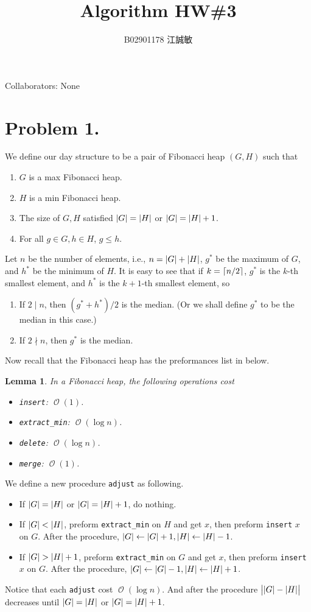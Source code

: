 \documentclass[12pt, a4paper]{article}
\title{Algorithm HW\#3}
\author{B02901178 江誠敏}
\DeclarePairedDelimiter{\abs}{\lvert}{\rvert}
\DeclarePairedDelimiter{\ceil}{\lceil}{\rceil}
\newcommand{\opord}{\operatorname{\mathcal{O}}}
\newcommand{\ord}[1]{\opord\left(#1\right)}
\newtheorem{lemma}{Lemma}
\begin{document}
\maketitle
Collaborators: None

\section{Problem 1.}
We define our day structure to be a pair of Fibonacci heap $(G, H)$ such that 
\begin{enumerate}
  \item $G$ is a max Fibonacci heap.
  \item $H$ is a min Fibonacci heap. 
  \item The size of $G, H$ satisfied $\abs{G} = \abs{H}$ or $\abs{G} = \abs{H} + 1$.
  \item For all $g \in G, h \in H$, $g \leq h$.
\end{enumerate}
Let $n$ be the number of elements, i.e., $n = \abs{G} + \abs{H}$,
$g^*$ be the maximum of $G$, and $h^*$ be the minimum of $H$. It is easy to see that
if $k = \ceil{n/2}$, $g^*$ is the $k$-th smallest element, and $h^*$ is the $k+1$-th
smallest element, so
\begin{enumerate}
  \item If $2 \mid n$, then $(g^* + h^*) / 2$ is the median. (Or we shall define $g^*$ to
    be the median in this case.)
  \item If $2 \nmid n$, then $g^*$ is the median.
\end{enumerate}
Now recall that the Fibonacci heap has the preformances list in below.
\begin{lemma}
  In a Fibonacci heap, the following operations cost
  \begin{itemize}[itemsep=-0.2cm]
    \item {\tt insert}: $\ord{1}$.
    \item {\tt extract\_min}: $\ord{\log n}$.
    \item {\tt delete}: $\ord{\log n}$.
    \item {\tt merge}: $\ord{1}$.
  \end{itemize}
\end{lemma}

We define a new procedure {\tt adjust} as following.
\begin{itemize}
  \item If $\abs{G} = \abs{H}$ or $\abs{G} = \abs{H} + 1$, do nothing.
  \item If $\abs{G} < \abs{H}$, preform {\tt extract\_min} on $H$ and get $x$,
    then preform {\tt insert} $x$ on $G$. After the procedure, $\abs{G} \gets \abs{G} + 1,
    \abs{H} \gets \abs{H} - 1$.
  \item If $\abs{G} > \abs{H} + 1$, preform {\tt extract\_min} on $G$ and get $x$,
    then preform {\tt insert} $x$ on $G$. After the procedure, $\abs{G} \gets \abs{G} - 1,
    \abs{H} \gets \abs{H} + 1$.
\end{itemize}
Notice that each {\tt adjust} cost $\ord{\log n}$. And after the procedure
$\big| \abs{G} - \abs{H} \big|$ decreases until $\abs{G} = \abs{H}$ or $\abs{G} = \abs{H} + 1$.
\end{document}

